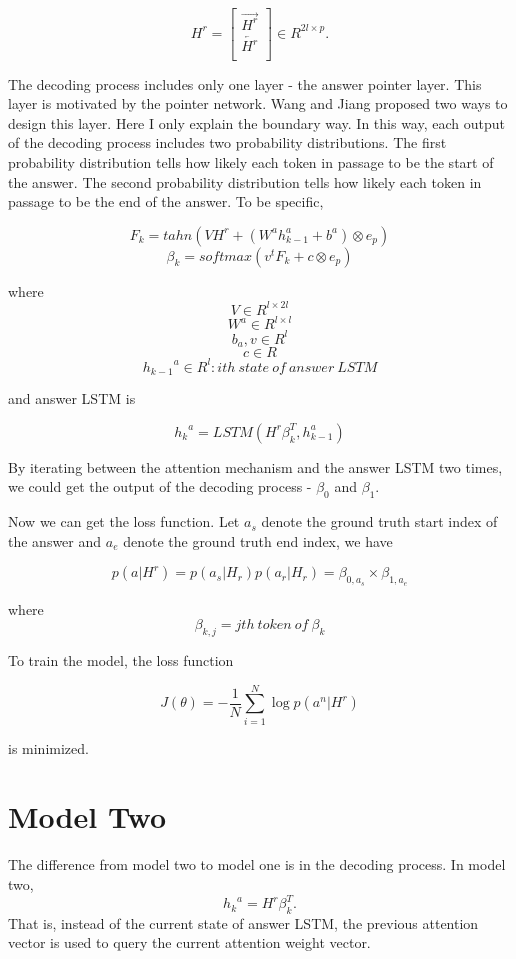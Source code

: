 \documentclass[modernstyle,12pt]{sjsuthesis}
\theoremstyle{definition}
\begin{document}
\[ H^r =
\begin{bmatrix}
\overrightarrow{H^r} \\
\overleftarrow{H^r} \\
\end{bmatrix}
\in R^{2l \times p}.
\]

The decoding process includes only one layer - the answer pointer layer. This layer is motivated by the pointer network. Wang and Jiang proposed two ways to design this layer. Here I only explain the boundary way. In this way, each output of the decoding process includes two probability distributions. The first probability distribution tells how likely each token in passage to be the start of the answer. The second probability distribution tells how likely each token in passage to be the end of the answer. To be specific,

$$F_k = tahn(VH^r + (W^a{h^a_{k-1}} +  b^a) \otimes e_p)$$
$$\beta _k = softmax(v^tF_k + c \otimes e_p)$$


where
$$V \in R^{l \times 2l}$$
$$W^a\in R^{l \times l} $$
$$b_a, v\in R^{l}  $$
$$c \in R $$
$${h_{k-1}}^a\in R^{l}: ith\ state\ of\ answer\ LSTM  $$

and answer LSTM is


$${h_k}^a = LSTM(H^r\beta _k^T, h_{k-1}^a)$$

By iterating between the attention mechanism and the answer LSTM two times, we could get the output of the decoding process - $\beta _0$ and $\beta _1$.


Now we can get the loss function. Let $a_s$ denote the ground truth start index of the answer and $a_e$ denote the ground truth end index, we have

$$p(a|H^r) = p(a_s|H_r)p(a_r|H_r)=\beta _{0, a_s} \times \beta_{1, a_e}$$

where $$\beta_{k, j} = jth\ token\ of\ \beta _k$$

To train the model, the loss function

$$J(\theta) = -\frac{1}{N}\sum_{i=1}^{N} \log{p(a^n|H^r)} $$

is minimized.

\section{Model Two} \label{sect:change_0}

The difference from model two to model one is in the decoding process. In model two,
$${h_k}^a = H^r\beta _{k}^T.$$
That is, instead of the current state of answer LSTM, the previous attention vector is used to query the current attention weight vector.
\end{document}
